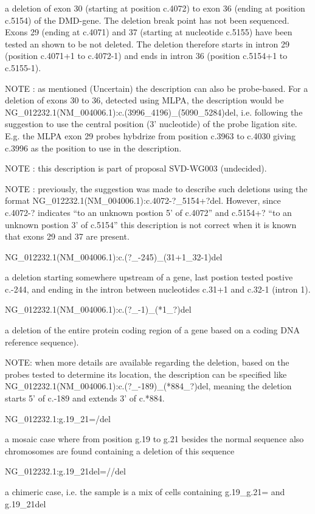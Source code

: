 \documentclass{book}
\begin{document}
	a deletion of exon 30 (starting at position c.4072) to exon 36 (ending at position c.5154) of the DMD-gene. The deletion break point has not been sequenced. Exons 29 (ending at c.4071) and 37 (starting at nucleotide c.5155) have been tested an shown to be not deleted. The deletion therefore starts in intron 29 (position c.4071+1 to c.4072-1) and ends in intron 36 (position c.5154+1 to c.5155-1).

	NOTE : as mentioned (Uncertain) the description can also be probe-based. For a deletion of exons 30 to 36, detected using MLPA, the description would be NG\_012232.1(NM\_004006.1):c.(3996\_4196)\_(5090\_5284)del, i.e. following the suggestion to use the central position (3’ nucleotide) of the probe ligation site. E.g. the MLPA exon 29 probes hybdrize from position c.3963 to c.4030 giving c.3996 as the position to use in the description.

	NOTE : this description is part of proposal SVD-WG003 (undecided).

	NOTE : previously, the suggestion was made to describe such deletions using the format NG\_012232.1(NM\_004006.1):c.4072-?\_5154+?del. However, since c.4072-? indicates “to an unknown postion 5’ of c.4072” and c.5154+? “to an unknown postion 3’ of c.5154” this description is not correct when it is known that exons 29 and 37 are present.

	NG\_012232.1(NM\_004006.1):c.(?\_-245)\_(31+1\_32-1)del

	a deletion starting somewhere upstream of a gene, last postion tested postive c.-244, and ending in the intron between nucleotides c.31+1 and c.32-1 (intron 1).

	NG\_012232.1(NM\_004006.1):c.(?\_-1)\_(*1\_?)del

	a deletion of the entire protein coding region of a gene based on a coding DNA reference sequence).

	NOTE: when more details are available regarding the deletion, based on the probes tested to determine its location, the description can be specified like NG\_012232.1(NM\_004006.1):c.(?\_-189)\_(*884\_?)del, meaning the deletion starts 5’ of c.-189 and extends 3’ of c.*884.

	NG\_012232.1:g.19\_21=/del

	a mosaic case where from position g.19 to g.21 besides the normal sequence also chromosomes are found containing a deletion of this sequence

	NG\_012232.1:g.19\_21del=//del

	a chimeric case, i.e. the sample is a mix of cells containing g.19\_g.21= and g.19\_21del
\end{document}
